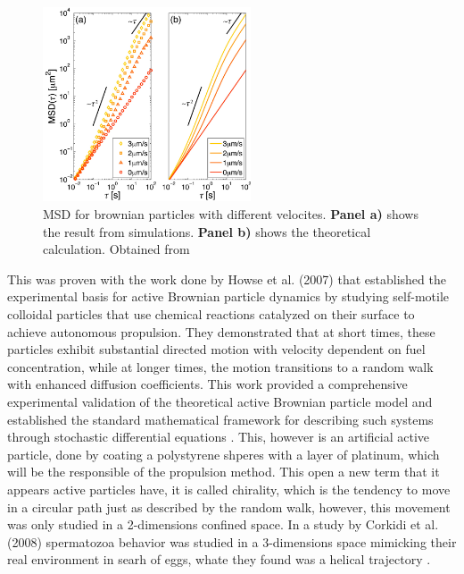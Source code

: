\begin{figure}
  \begin{center}
    \includegraphics[width=0.55\textwidth]{figures/msddifferentvelocities.png}
  \end{center}
  \caption[MSD for passive and active brownian particles]{MSD for brownian particles with different velocites. \textbf{Panel a)} shows the result from simulations. \textbf{Panel b)} shows the theoretical calculation. Obtained from \cite{volpe2014simulation}}\label{fig:msddifferentvelocities}
\end{figure}


This was proven with the work done by Howse et al. (2007) that established the experimental basis for active Brownian particle dynamics by studying self-motile colloidal particles that use chemical reactions catalyzed on their surface to achieve autonomous propulsion. They demonstrated that at short times, these particles exhibit substantial directed motion with velocity dependent on fuel concentration, while at longer times, the motion transitions to a random walk with enhanced diffusion coefficients. This work provided a comprehensive experimental validation of the theoretical active Brownian particle model and established the standard mathematical framework for describing such systems through stochastic differential equations \cite{howse2007self}. This, however is an artificial active particle, done by coating a polystyrene shperes with a layer of platinum, which will be the responsible of the propulsion method. This open a new term that it appears active particles have, it is called chirality, which is the tendency to move in a circular path just as described by the random walk, however, this movement was only studied in a 2-dimensions confined space. In a study by Corkidi et al. (2008) spermatozoa behavior was studied in a 3-dimensions space mimicking their real environment in searh of eggs, whate they found was a helical trajectory \cite{corkidi2008tracking}.


